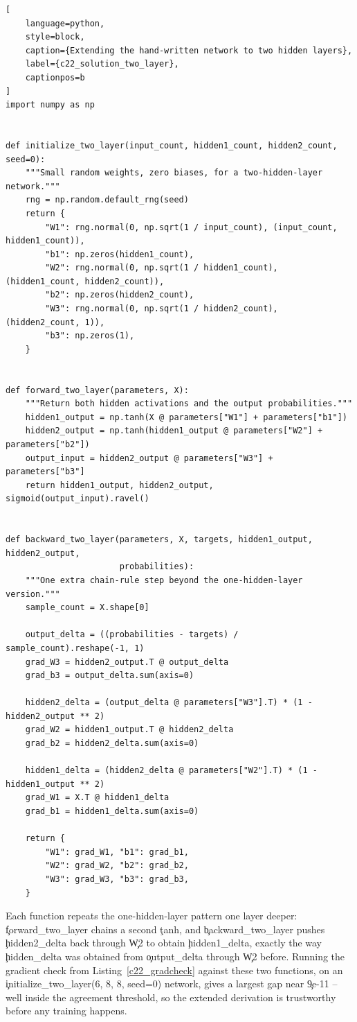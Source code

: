 \begin{lstlisting}[
    language=python,
    style=block,
    caption={Extending the hand-written network to two hidden layers},
    label={c22_solution_two_layer},
    captionpos=b
]
import numpy as np


def initialize_two_layer(input_count, hidden1_count, hidden2_count, seed=0):
    """Small random weights, zero biases, for a two-hidden-layer network."""
    rng = np.random.default_rng(seed)
    return {
        "W1": rng.normal(0, np.sqrt(1 / input_count), (input_count, hidden1_count)),
        "b1": np.zeros(hidden1_count),
        "W2": rng.normal(0, np.sqrt(1 / hidden1_count), (hidden1_count, hidden2_count)),
        "b2": np.zeros(hidden2_count),
        "W3": rng.normal(0, np.sqrt(1 / hidden2_count), (hidden2_count, 1)),
        "b3": np.zeros(1),
    }


def forward_two_layer(parameters, X):
    """Return both hidden activations and the output probabilities."""
    hidden1_output = np.tanh(X @ parameters["W1"] + parameters["b1"])
    hidden2_output = np.tanh(hidden1_output @ parameters["W2"] + parameters["b2"])
    output_input = hidden2_output @ parameters["W3"] + parameters["b3"]
    return hidden1_output, hidden2_output, sigmoid(output_input).ravel()


def backward_two_layer(parameters, X, targets, hidden1_output, hidden2_output,
                       probabilities):
    """One extra chain-rule step beyond the one-hidden-layer version."""
    sample_count = X.shape[0]

    output_delta = ((probabilities - targets) / sample_count).reshape(-1, 1)
    grad_W3 = hidden2_output.T @ output_delta
    grad_b3 = output_delta.sum(axis=0)

    hidden2_delta = (output_delta @ parameters["W3"].T) * (1 - hidden2_output ** 2)
    grad_W2 = hidden1_output.T @ hidden2_delta
    grad_b2 = hidden2_delta.sum(axis=0)

    hidden1_delta = (hidden2_delta @ parameters["W2"].T) * (1 - hidden1_output ** 2)
    grad_W1 = X.T @ hidden1_delta
    grad_b1 = hidden1_delta.sum(axis=0)

    return {
        "W1": grad_W1, "b1": grad_b1,
        "W2": grad_W2, "b2": grad_b2,
        "W3": grad_W3, "b3": grad_b3,
    }
\end{lstlisting}

Each function repeats the one-hidden-layer pattern one layer deeper:
\c{forward_two_layer} chains a second \c{tanh}, and \c{backward_two_layer}
pushes \c{hidden2_delta} back through \c{W2} to obtain \c{hidden1_delta}, exactly
the way \c{hidden_delta} was obtained from \c{output_delta} through \c{W2}
before. Running the gradient check from Listing~\ref{c22_gradcheck} against
these two functions, on an \c{initialize_two_layer(6, 8, 8, seed=0)} network,
gives a largest gap near \c{9e-11} -- well inside the agreement threshold, so
the extended derivation is trustworthy before any training happens.

